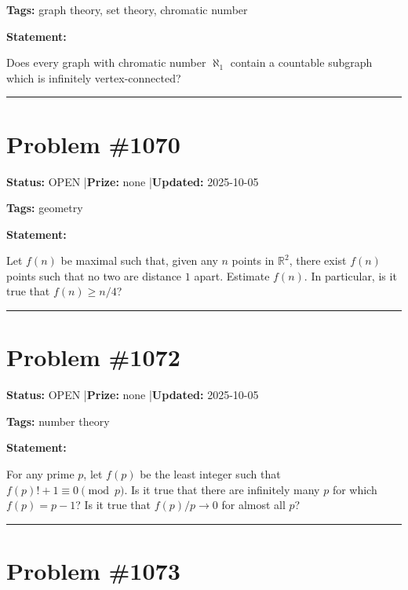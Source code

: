 \documentclass{article}
\begin{document}
\noindent\textbf{Tags:} graph theory, set theory, chromatic number

\medskip

\noindent\textbf{Statement:}

Does every graph with chromatic number $\aleph_1$ contain a countable subgraph which is infinitely vertex-connected?

\noindent\rule{\linewidth}{0.4pt}


\section{Problem \#1070}
\label{prob:1070}

\noindent\textbf{Status:} OPEN \quad|\quad \textbf{Prize:} none \quad|\quad \textbf{Updated:} 2025-10-05

\noindent\textbf{Tags:} geometry

\medskip

\noindent\textbf{Statement:}

Let $f(n)$ be maximal such that, given any $n$ points in $\mathbb{R}^2$, there exist $f(n)$ points such that no two are distance $1$ apart. Estimate $f(n)$. In particular, is it true that $f(n)\geq n/4$?

\noindent\rule{\linewidth}{0.4pt}


\section{Problem \#1072}
\label{prob:1072}

\noindent\textbf{Status:} OPEN \quad|\quad \textbf{Prize:} none \quad|\quad \textbf{Updated:} 2025-10-05

\noindent\textbf{Tags:} number theory

\medskip

\noindent\textbf{Statement:}

For any prime $p$, let $f(p)$ be the least integer such that $f(p)!+1\equiv 0\pmod{p}$. Is it true that there are infinitely many $p$ for which $f(p)=p-1$? Is it true that $f(p)/p\to 0$ for almost all $p$?

\noindent\rule{\linewidth}{0.4pt}


\section{Problem \#1073}
\label{prob:1073}
\end{document}
